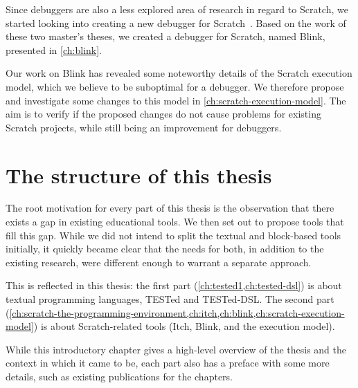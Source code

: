 \documentclass[./main]{subfiles}
\begin{document}
Since debuggers are also a less explored area of research in regard to Scratch, we started looking into creating a new debugger for Scratch~\autocite{deproftBlinkEenEducatieve2022,goethalsEenTimeTravelling2023}.
Based on the work of these two master's theses, we created a debugger for Scratch, named Blink, presented in \cref{ch:blink}.

Our work on Blink has revealed some noteworthy details of the Scratch execution model, which we believe to be suboptimal for a debugger.
We therefore propose and investigate some changes to this model in \cref{ch:scratch-execution-model}.
The aim is to verify if the proposed changes do not cause problems for existing Scratch projects, while still being an improvement for debuggers.

\section{The structure of this thesis}\label{sec:a-note-on-the-structure-of-this-thesis}

The root motivation for every part of this thesis is the observation that there exists a gap in existing educational tools.
We then set out to propose tools that fill this gap.
While we did not intend to split the textual and block-based tools initially, it quickly became clear that the needs for both, in addition to the existing research, were different enough to warrant a separate approach.

This is reflected in this thesis: the first part (\cref{ch:tested1,ch:tested-dsl}) is about textual programming languages, TESTed and TESTed-DSL\@.
The second part (\cref{ch:scratch-the-programming-environment,ch:itch,ch:blink,ch:scratch-execution-model}) is about Scratch-related tools (Itch, Blink, and the execution model).

While this introductory chapter gives a high-level overview of the thesis and the context in which it came to be, each part also has a preface with some more details, such as existing publications for the chapters.
\end{document}
